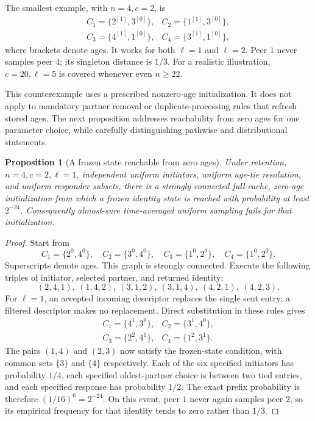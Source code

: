\documentclass[11pt]{article}
\newtheorem{proposition}[theorem]{Proposition}
\begin{document}
The smallest example, with $n=4,c=2$, is
\[
\begin{array}{ll}
C_1=\{2^{[1]},3^{[0]}\},&C_2=\{1^{[1]},3^{[0]}\},\\
C_3=\{4^{[1]},1^{[0]}\},&C_4=\{3^{[1]},1^{[0]}\},
\end{array}
\]
where brackets denote ages. It works for both $\ell=1$ and $\ell=2$.
Peer $1$ never samples peer $4$; its singleton distance is $1/3$.
For a realistic illustration, $c=20,\ell=5$ is covered whenever
even $n\ge22$.

This counterexample uses a prescribed nonzero-age initialization.
It does not apply to mandatory partner removal or duplicate-processing
rules that refresh stored ages. The next proposition addresses
reachability from zero ages for one parameter choice, while carefully
distinguishing pathwise and distributional statements.

\begin{proposition}[A frozen state reachable from zero ages]
\label{prop:zero}
Under retention, $n=4,c=2,\ell=1$, independent uniform initiators,
uniform age-tie resolution, and uniform responder subsets, there is
a strongly connected full-cache, zero-age initialization from which
a frozen identity state is reached with probability at least $2^{-24}$.
Consequently almost-sure time-averaged uniform sampling fails for that
initialization.
\end{proposition}
\begin{proof}
Start from
\[
C_1=\{2^0,4^0\},\quad C_2=\{3^0,4^0\},\quad
C_3=\{1^0,2^0\},\quad C_4=\{1^0,2^0\}.
\]
Superscripts denote ages. This graph is strongly connected.
Execute the following triples of initiator, selected partner, and
returned identity:
\[
(2,4,1),\ (1,4,2),\ (3,1,2),\
(3,1,4),\ (4,2,1),\ (4,2,3).
\]
For $\ell=1$, an accepted incoming descriptor replaces the single
sent entry; a filtered descriptor makes no replacement. Direct
substitution in these rules gives
\[
\begin{array}{ll}
C_1=\{4^1,3^0\},& C_2=\{3^1,4^0\},\\
C_3=\{2^2,4^1\},& C_4=\{1^2,3^1\}.
\end{array}
\]
The pairs $(1,4)$ and $(2,3)$ now satisfy the frozen-state condition,
with common sets $\{3\}$ and $\{4\}$ respectively.
Each of the six specified initiators has probability $1/4$,
each specified oldest-partner choice is between two tied entries,
and each specified response has probability $1/2$.
The exact prefix probability is therefore $(1/16)^6=2^{-24}$.
On this event, peer $1$ never again samples peer $2$, so its empirical
frequency for that identity tends to zero rather than $1/3$.
\end{proof}
\end{document}
